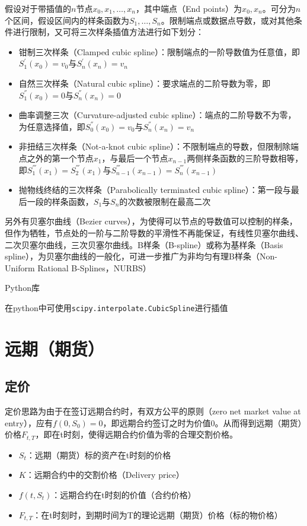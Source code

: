 \documentclass[11pt]{article}
\begin{document}
假设对于带插值的$n$节点$x_0,x_1,\dots,x_n$，其中端点（End points）为$x_0,x_n$。可分为$n$个区间，假设区间内的样条函数为$S_1,\dots,S_n$。限制端点或数据点导数，或对其他条件进行限制，又可将三次样条插值方法进行如下划分：
\begin{itemize}
    \item 钳制三次样条（Clamped cubic spline）：限制端点的一阶导数值为任意值，即$S_{1}^{'}(x_0)=v_0$与$S_{n}^{'}(x_{n})=v_n$
    \item 自然三次样条（Natural cubic spline）：要求端点的二阶导数为零，即$S_{1}^{''}(x_0)=0$与$S_{n}^{''}(x_{n})=0$
    \item 曲率调整三次（Curvature-adjusted cubic spline）：端点的二阶导数不为零，为任意选择值，即$S_{0}^{''}(x_0)=v_0$与$S_{n}^{''}(x_{n})=v_n$
    \item 非扭结三次样条（Not-a-knot cubic spline）：不限制端点的导数，但限制除端点之外的第一个节点$x_1$，与最后一个节点$x_{n-1}$两侧样条函数的三阶导数相等，即$S_{1}^{'''}(x_1) = S_{2}^{'''}(x_{1})$与$S_{n-1}^{'''}(x_{n-1}) = S_{n}^{'''}(x_{n-1})$
    \item 抛物线终结的三次样条（Parabolically terminated cubic spline）：第一段与最后一段的样条函数，$S_1$与$S_n$的次数被限制在最高二次
\end{itemize}

另外有贝塞尔曲线（Bezier curves），为使得可以节点的导数值可以控制的样条，但作为牺牲，节点处的一阶与二阶导数的平滑性不再能保证，有线性贝塞尔曲线、二次贝塞尔曲线，三次贝塞尔曲线。B样条（B-spline）或称为基样条（Basis spline），为贝塞尔曲线的一般化，可进一步推广为非均匀有理B样条（Non-Uniform Rational B-Splines，NURBS）

\begin{remark}
    Python库

    在python中可使用\verb|scipy.interpolate.CubicSpline|进行插值
\end{remark}

\section{远期（期货）}

\subsection{定价}

定价思路为由于在签订远期合约时，有双方公平的原则（zero net market value at entry），应有$f(0,S_0)=0$，即远期合约签订之时为价值0。从而得到远期（期货）价格$F_{t,T}$，即在t时刻，使得远期合约价值为零的合理交割价格。
\begin{itemize}
    \item $S_t$：远期（期货）标的资产在t时刻的价格
    \item $K$：远期合约中的交割价格（Delivery price）
    \item $f(t,S_t)$：远期合约在t时刻的价值（合约价格）
    \item $F_{t,T}$：在t时刻时，到期时间为T的理论远期（期货）价格（标的物价格）
\end{itemize}
\end{document}
